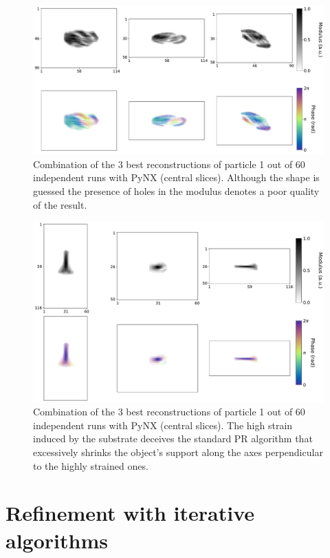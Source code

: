 \begin{figure}[H]
    \centering
    \includegraphics[width=\textwidth]{figures/Phasing/exp_data_pynx1.pdf}
    \caption{Combination of the 3 best reconstructions of particle 1 out of 60 independent runs with PyNX (central slices). 
    Although the shape is guessed the presence of holes in the modulus denotes a poor quality of the result.}
    \label{fig:pynx_rec1}
\end{figure}
\begin{figure}[H]
    \centering
    \includegraphics[width=\textwidth]{figures/Phasing/exp_data_pynx2.pdf}
    \caption{Combination of the 3 best reconstructions of particle 1 out of 60 independent runs with PyNX (central slices). 
    The high strain induced by the substrate deceives the standard PR algorithm that excessively shrinks the object's support 
    along the axes perpendicular to the highly strained ones. }
    \label{fig:pynx_rec2}
\end{figure}

\section{Refinement with iterative algorithms}\label{chp:refinement}

